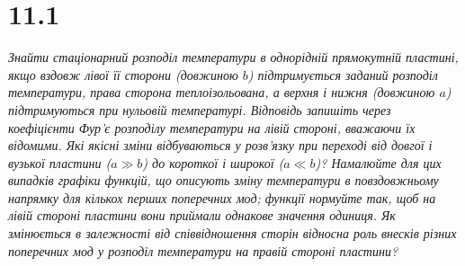 


%


\section[Задача №11.1]{11.1}

\textit{Знайти стаціонарний розподіл температури в однорідній прямокутній пластині, якщо вздовж лівої її сторони (довжиною $b$) підтримується заданий розподіл температури, права сторона теплоізольована, а верхня і нижня (довжиною $a$) підтримуються при нульовій температурі. Відповідь запишіть через коефіцієнти Фур’є розподілу температури на лівій стороні, вважаючи їх відомими. Які якісні зміни відбуваються у розв’язку при переході від довгої і вузької пластини ($a \gg b$) до короткої і широкої ($a \ll b$)? Намалюйте для цих випадків графіки функцій, що описують зміну температури в повздовжньому напрямку для кількох перших поперечних мод; функції нормуйте так, щоб на лівій стороні пластини вони приймали однакове значення одиниця. Як змінюється в залежності від співвідношення сторін відносна роль внесків різних поперечних мод у розподіл температури на правій стороні пластини?}


%
